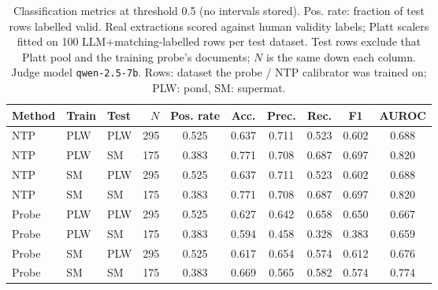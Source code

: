 \begin{table}[t]
\centering
\small
\caption{Classification metrics at threshold 0.5 (no intervals stored). Pos. rate: fraction of test rows labelled valid. Real extractions scored against human validity labels; Platt scalers fitted on 100 LLM+matching-labelled rows per test dataset. Test rows exclude that Platt pool and the training probe's documents; $N$ is the same down each column. Judge model \texttt{qwen-2.5-7b}. Rows: dataset the probe / NTP calibrator was trained on; PLW: pond, SM: supermat.}
\label{tab:calibration-validated-real-classification}
\begin{tabular}{lllrcccccc}
\toprule
Method & Train & Test & $N$ & Pos. rate & Acc. & Prec. & Rec. & F1 & AUROC \\
\midrule
NTP & PLW & PLW & 295 & 0.525 & 0.637 & 0.711 & 0.523 & 0.602 & 0.688 \\
NTP & PLW & SM & 175 & 0.383 & 0.771 & 0.708 & 0.687 & 0.697 & 0.820 \\
NTP & SM & PLW & 295 & 0.525 & 0.637 & 0.711 & 0.523 & 0.602 & 0.688 \\
NTP & SM & SM & 175 & 0.383 & 0.771 & 0.708 & 0.687 & 0.697 & 0.820 \\
\midrule
Probe & PLW & PLW & 295 & 0.525 & 0.627 & 0.642 & 0.658 & 0.650 & 0.667 \\
Probe & PLW & SM & 175 & 0.383 & 0.594 & 0.458 & 0.328 & 0.383 & 0.659 \\
Probe & SM & PLW & 295 & 0.525 & 0.617 & 0.654 & 0.574 & 0.612 & 0.676 \\
Probe & SM & SM & 175 & 0.383 & 0.669 & 0.565 & 0.582 & 0.574 & 0.774 \\
\bottomrule
\end{tabular}
\end{table}
